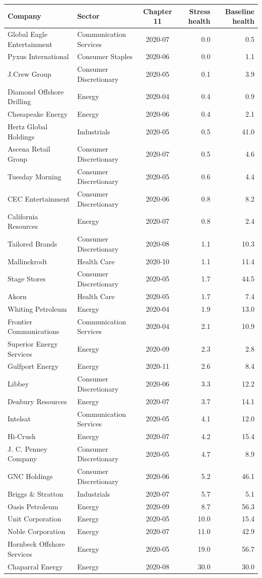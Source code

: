 \begin{tabular}{llcrr}
\toprule
Company & Sector & Chapter 11 & Stress health & Baseline health \\
\midrule
Global Eagle Entertainment & Communication Services & 2020-07 & 0.0 & 0.5 \\
Pyxus International & Consumer Staples & 2020-06 & 0.0 & 1.1 \\
J.Crew Group & Consumer Discretionary & 2020-05 & 0.1 & 3.9 \\
Diamond Offshore Drilling & Energy & 2020-04 & 0.4 & 0.9 \\
Chesapeake Energy & Energy & 2020-06 & 0.4 & 2.1 \\
Hertz Global Holdings & Industrials & 2020-05 & 0.5 & 41.0 \\
Ascena Retail Group & Consumer Discretionary & 2020-07 & 0.5 & 4.6 \\
Tuesday Morning & Consumer Discretionary & 2020-05 & 0.6 & 4.4 \\
CEC Entertainment & Consumer Discretionary & 2020-06 & 0.8 & 8.2 \\
California Resources & Energy & 2020-07 & 0.8 & 2.4 \\
Tailored Brands & Consumer Discretionary & 2020-08 & 1.1 & 10.3 \\
Mallinckrodt & Health Care & 2020-10 & 1.1 & 11.4 \\
Stage Stores & Consumer Discretionary & 2020-05 & 1.7 & 44.5 \\
Akorn & Health Care & 2020-05 & 1.7 & 7.4 \\
Whiting Petroleum & Energy & 2020-04 & 1.9 & 13.0 \\
Frontier Communications & Communication Services & 2020-04 & 2.1 & 10.9 \\
Superior Energy Services & Energy & 2020-09 & 2.3 & 2.8 \\
Gulfport Energy & Energy & 2020-11 & 2.6 & 8.4 \\
Libbey & Consumer Discretionary & 2020-06 & 3.3 & 12.2 \\
Denbury Resources & Energy & 2020-07 & 3.7 & 14.1 \\
Intelsat & Communication Services & 2020-05 & 4.1 & 12.0 \\
Hi-Crush & Energy & 2020-07 & 4.2 & 15.4 \\
J. C. Penney Company & Consumer Discretionary & 2020-05 & 4.7 & 8.9 \\
GNC Holdings & Consumer Discretionary & 2020-06 & 5.2 & 46.1 \\
Briggs \& Stratton & Industrials & 2020-07 & 5.7 & 5.1 \\
Oasis Petroleum & Energy & 2020-09 & 8.7 & 56.3 \\
Unit Corporation & Energy & 2020-05 & 10.0 & 15.4 \\
Noble Corporation & Energy & 2020-07 & 11.0 & 42.9 \\
Hornbeck Offshore Services & Energy & 2020-05 & 19.0 & 56.7 \\
Chaparral Energy & Energy & 2020-08 & 30.0 & 30.0 \\
\bottomrule
\end{tabular}
